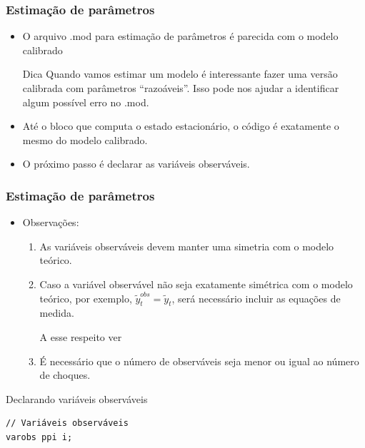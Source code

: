 \documentclass[xcolor=pdftex,dvipsnames,table]{beamer}
\newcommand{\ft}{\frametitle}
\begin{document}
\begin{frame}
\ft{Estimação de parâmetros}

\begin{itemize}
\item O arquivo .mod para estimação de parâmetros é parecida com o modelo calibrado

\begin{block}{Dica}
Quando vamos estimar um modelo é interessante fazer uma versão calibrada com parâmetros ``razoáveis''. Isso pode nos ajudar a identificar algum possível erro no .mod.
\end{block}

\item Até o bloco que computa o estado estacionário, o código é exatamente o mesmo do modelo calibrado.

\item O próximo passo é declarar as variáveis observáveis.
\end{itemize}
\end{frame}


\begin{frame}[fragile]
\ft{Estimação de parâmetros}

\begin{itemize}
\item Observações:

	\begin{enumerate}
	\item As variáveis observáveis devem manter uma simetria com o modelo teórico.
	\item Caso a variável observável não seja exatamente simétrica com o modelo teórico, por exemplo, $\tilde{y}_t^{obs}=\tilde{y}_t$, será necessário incluir as equações de medida.
	
	\footnotesize{A esse respeito ver  }
	
	\item É necessário que o número de observáveis seja menor ou igual ao número de choques.
	\end{enumerate}
\end{itemize}

\begin{block}{Declarando variáveis observáveis}
\begin{lstlisting}
// Variáveis observáveis
varobs ppi i;
\end{lstlisting}
\end{block}

\end{frame}
\end{document}
